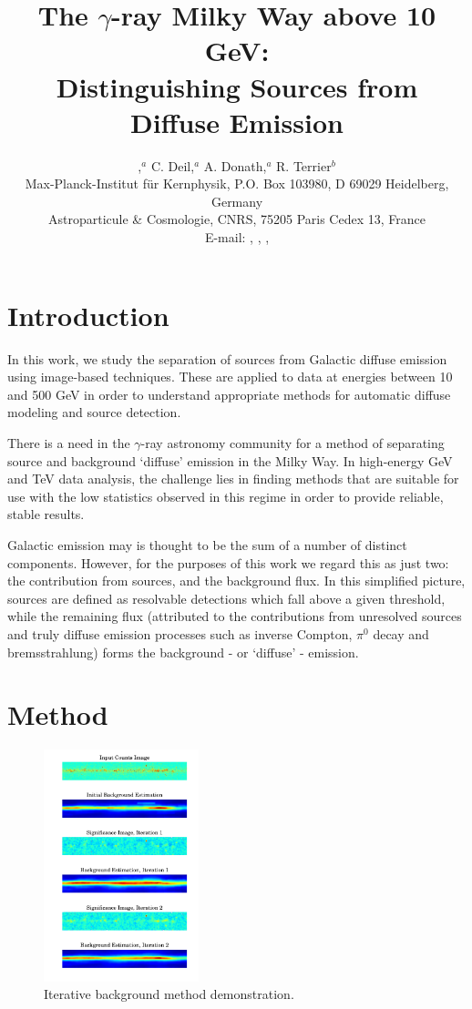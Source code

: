 \documentclass{PoS}
\title{The $\gamma$-ray Milky Way above 10 GeV:\\
Distinguishing Sources from Diffuse Emission}
\author{\speaker{E. Owen},$^a$ C. Deil,$^{a}$ A. Donath,$^{a}$ R. Terrier$^{b}$\\
\llap{$^a$}Max-Planck-Institut f\"{u}r Kernphysik, P.O. Box 103980, D
69029 Heidelberg, Germany\\
\llap{$^b$}Astroparticule \& Cosmologie, CNRS, 75205 Paris Cedex 13, France\\
E-mail: \email{ellis.owen@mpi-hd.mpg.de}, \email{christoph.deil@mpi-hd.mpg.de}, \email{axel.donath@mpi-hd.mpg.de}, \email{terrier@apc.univ-paris7.fr}}
\begin{document}
\section{Introduction}

In this work, we study the separation of sources from Galactic diffuse emission using image-based techniques. These are applied to data at energies between 10 and 500 GeV in order to understand appropriate methods for automatic diffuse modeling and source detection.

There is a need in the $\gamma$-ray astronomy community for a method of separating source and background `diffuse' emission in the Milky Way. In high-energy GeV and TeV data analysis, the challenge lies in finding methods that are suitable for use with the low statistics observed in this regime in order to provide reliable, stable results.

Galactic emission may is thought to be the sum of a number of distinct components. However, for the purposes of this work we regard this as just two: the contribution from sources, and the background flux. In this simplified picture, sources are defined as resolvable detections which fall above a given threshold, while the remaining flux (attributed to the contributions from unresolved sources and truly diffuse emission processes such as inverse Compton, $\pi^0$ decay and bremsstrahlung) forms the background - or `diffuse' - emission.

\section{Method}

\begin{figure}
\vspace{-10pt}
      \includegraphics[width=0.4\textwidth]{figures/iterations.pdf}
  \caption{Iterative background method demonstration.}
\vspace{-10pt}
\end{figure}
\end{document}
